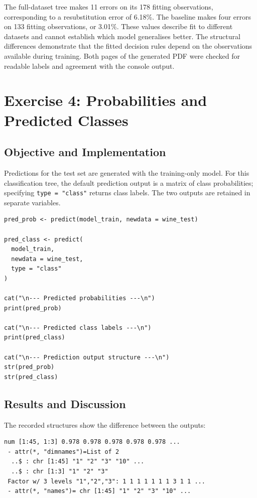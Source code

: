 \documentclass[11pt,a4paper]{article}
\begin{document}
The full-dataset tree makes 11 errors on its 178 fitting observations, corresponding to a resubstitution error of 6.18\%. The baseline makes four errors on 133 fitting observations, or 3.01\%. These values describe fit to different datasets and cannot establish which model generalises better. The structural differences demonstrate that the fitted decision rules depend on the observations available during training. Both pages of the generated PDF were checked for readable labels and agreement with the console output.

\section{Exercise 4: Probabilities and Predicted Classes}
\subsection{Objective and Implementation}
Predictions for the test set are generated with the training-only model. For this classification tree, the default prediction output is a matrix of class probabilities; specifying \texttt{type = "class"} returns class labels. The two outputs are retained in separate variables.
\begin{lstlisting}
pred_prob <- predict(model_train, newdata = wine_test)

pred_class <- predict(
  model_train,
  newdata = wine_test,
  type = "class"
)

cat("\n--- Predicted probabilities ---\n")
print(pred_prob)

cat("\n--- Predicted class labels ---\n")
print(pred_class)

cat("\n--- Prediction output structure ---\n")
str(pred_prob)
str(pred_class)
\end{lstlisting}

\subsection{Results and Discussion}
The recorded structures show the difference between the outputs:
\par\noindent\begin{minipage}{\linewidth}
  \begin{lstlisting}[style=console]
num [1:45, 1:3] 0.978 0.978 0.978 0.978 0.978 ...
 - attr(*, "dimnames")=List of 2
  ..$ : chr [1:45] "1" "2" "3" "10" ...
  ..$ : chr [1:3] "1" "2" "3"
 Factor w/ 3 levels "1","2","3": 1 1 1 1 1 1 1 3 1 1 ...
 - attr(*, "names")= chr [1:45] "1" "2" "3" "10" ...
\end{lstlisting}
\end{minipage}\par
\end{document}
